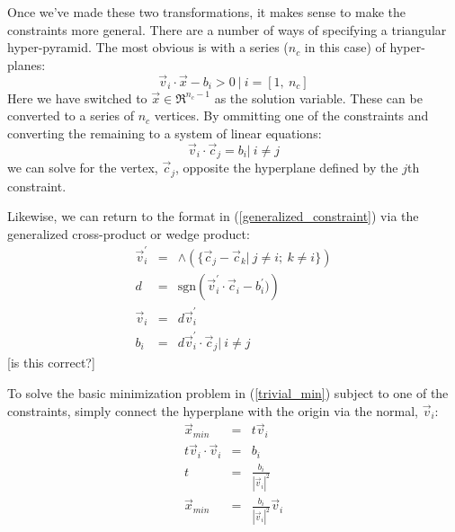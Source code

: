 \documentclass{article}
\begin{document}
Once we've made these two transformations, it makes sense to make the constraints
more general.  There are a number of ways of specifying a triangular
hyper-pyramid.  The most obvious is with a series ($n_c$ in this case) of hyper-
planes:
\begin{equation}
	\vec v_i \cdot \vec x - b_i > 0 ~ | ~ i=[1, ~n_c]
\label{generalized_constraint}
\end{equation}
Here we have switched to $\vec x \in \Re^{n_c-1}$ as the solution variable.  These can be 
converted to a series of $n_c$ vertices.  By ommitting one of the constraints
and converting the remaining to a system of linear equations:
\begin{equation}
\vec v_i \cdot \vec c_j = b_i | ~ i \ne j
\end{equation}
we can solve for the vertex, $\vec c_j$, opposite the hyperplane defined 
by the $j$th constraint.

Likewise, we can return to the format in (\ref{generalized_constraint}) via the
generalized cross-product or wedge product:
\begin{eqnarray}
	\vec v_i^\prime & = & \wedge \left ( \lbrace \vec c_j - \vec c_k |~ j \ne i;~k \ne i \rbrace \right ) \\
	d & = & \mathrm{sgn} \left (\vec v_i^\prime \cdot \vec c_i - b_i^\prime) \right ) \\
	\vec v_i & = & d \vec v_i^\prime \\
	b_i &= & d \vec v_i^\prime \cdot \vec c_j | ~ i \ne j
\end{eqnarray}
[is this correct?]

To solve the basic minimization problem in (\ref{trivial_min}) subject to
one of the constraints, simply connect the hyperplane with the origin via
the normal, $\vec v_i$:
\begin{eqnarray}
	\vec x_{min} & = & t \vec v_i \\
	t \vec v_i \cdot \vec v_i & = & b_i \\
	t & = & \frac{b_i}{|\vec v_i|^2} \\
	\vec x_{min} & = & \frac{b_i}{|\vec v_i |^2} \vec v_i \label{solution_1constraint}
\end{eqnarray}
\end{document}
